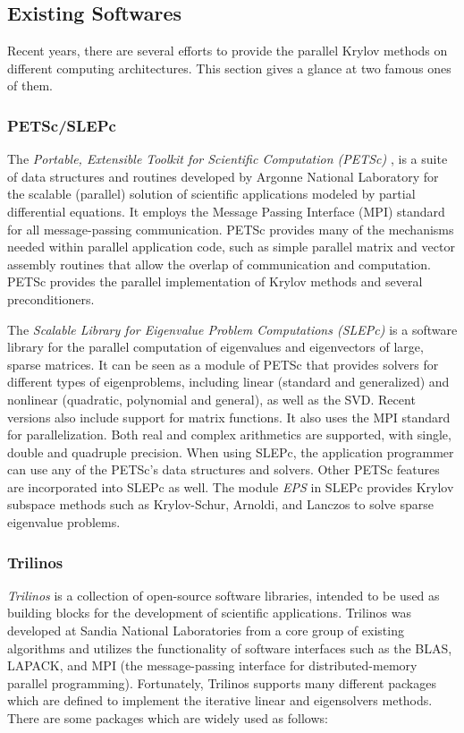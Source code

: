 {\subsection{Existing Softwares}

Recent years, there are several efforts to provide the parallel Krylov methods on different computing architectures. This section gives a glance at two famous ones of them.

\subsubsection{PETSc/SLEPc} 

The \textit{Portable, Extensible Toolkit for Scientific Computation (PETSc)} \cite{balay2001petsc}, is a suite of data structures and routines developed by Argonne National Laboratory for the scalable (parallel) solution of scientific applications modeled by partial differential equations. It employs the Message Passing Interface (MPI) standard for all message-passing communication. PETSc provides many of the mechanisms needed within parallel application code, such as simple parallel matrix and vector assembly routines that allow the overlap of communication and computation. PETSc provides the parallel implementation of Krylov methods and several preconditioners.

The \textit{Scalable Library for Eigenvalue Problem Computations (SLEPc)} \cite{hernandez2005slepc} is a software library for the parallel computation of eigenvalues and eigenvectors of large, sparse matrices. It can be seen as a module of PETSc that provides solvers for different types of eigenproblems, including linear (standard and generalized) and nonlinear (quadratic, polynomial and general), as well as the SVD. Recent versions also include support for matrix functions. It also uses the MPI standard for parallelization. Both real and complex arithmetics are supported, with single, double and quadruple precision. When using SLEPc, the application programmer can use any of the PETSc's data structures and solvers. Other PETSc features are incorporated into SLEPc as well. The module \textit{EPS} in SLEPc provides Krylov subspace methods such as Krylov-Schur, Arnoldi, and Lanczos to solve sparse eigenvalue problems.

\subsubsection{Trilinos} 

\textit{Trilinos} \cite{heroux2005overview} is a collection of open-source software libraries, intended to be used as building blocks for the development of scientific applications. Trilinos was developed at Sandia National Laboratories from a core group of existing algorithms and utilizes the functionality of software interfaces such as the BLAS, LAPACK, and MPI (the message-passing interface for distributed-memory parallel programming). Fortunately, Trilinos supports many different packages which are defined to implement the iterative linear and eigensolvers methods. There are some packages which are widely used as follows:

}
